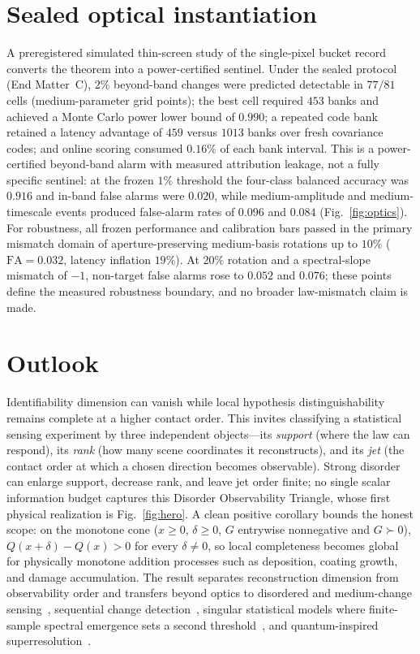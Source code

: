 \documentclass[aps,prl,reprint,groupedaddress,superscriptaddress,floatfix]{revtex4-2}
\begin{document}
\section*{Sealed optical instantiation}
A preregistered simulated thin-screen study of the single-pixel bucket record
converts the theorem into a power-certified sentinel. Under the sealed protocol
(End Matter~C), $2\%$ beyond-band changes were predicted detectable in $77/81$
cells (medium-parameter grid points); the best cell required $453$ banks and
achieved a Monte Carlo power lower
bound of $0.990$; a repeated code bank retained a latency advantage of $459$
versus $1013$ banks over fresh covariance codes; and online scoring consumed
$0.16\%$ of each bank interval. This is a power-certified beyond-band alarm with
measured attribution leakage, not a fully specific sentinel: at the frozen $1\%$
threshold the four-class balanced accuracy was $0.916$ and in-band false alarms
were $0.020$, while medium-amplitude and medium-timescale events produced
false-alarm rates of $0.096$ and $0.084$ (Fig.~\ref{fig:optics}). For robustness,
all frozen performance and calibration bars passed in the primary mismatch domain
of aperture-preserving medium-basis rotations up to $10\%$ ($\mathrm{FA}=0.032$,
latency inflation $19\%$). At $20\%$ rotation and a spectral-slope mismatch of
$-1$, non-target false alarms rose to $0.052$ and $0.076$; these points define the
measured robustness boundary, and no broader law-mismatch claim is made.

\section*{Outlook}
Identifiability dimension can vanish while local hypothesis distinguishability
remains complete at a higher contact order. This invites classifying a
statistical sensing experiment by three independent objects---its
\emph{support} (where the law can respond), its \emph{rank} (how many scene
coordinates it reconstructs), and its \emph{jet} (the contact order at which a
chosen direction becomes observable). Strong disorder can enlarge support,
decrease rank, and leave jet order finite; no single scalar information budget
captures this Disorder Observability Triangle, whose first physical realization
is Fig.~\ref{fig:hero}. A clean positive corollary bounds the honest scope: on the
monotone cone ($x\ge0$, $\delta\ge0$, $G$ entrywise nonnegative and $G\succ0$),
$Q(x+\delta)-Q(x)>0$ for every $\delta\neq0$, so local completeness becomes global
for physically monotone addition processes such as deposition, coating growth, and
damage accumulation. The result separates reconstruction dimension from
observability order and transfers beyond optics to disordered and medium-change
sensing~\cite{LeeStone,Snieder}, sequential change detection~\cite{Lorden}, singular
statistical models where finite-sample spectral emergence sets a second
threshold~\cite{BBP}, and quantum-inspired superresolution~\cite{Tsang}.
\end{document}
